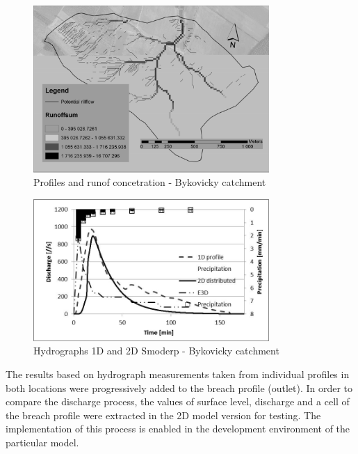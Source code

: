 \begin{figure}[ht!]
\centering
\includegraphics[width=0.8\textwidth]{img/byk.jpg}
\caption{Profiles and runof concetration - Bykovicky catchment }
\label{fig:horany2}
\end{figure}\FloatBarrier

\begin{figure}[ht!]
\renewcommand{\figurename}{Graf}
\centering
\includegraphics[width=0.8\textwidth]{graph/1D2DByk.jpg}
\caption{Hydrographs 1D and 2D Smoderp - Bykovicky catchment}
\label{graf:graf_2}
\end{figure}\FloatBarrier

The results based on hydrograph measurements taken from individual profiles in both locations were progressively added to the breach profile (outlet). In order to compare the discharge process, the values of surface level, discharge and a cell of the breach profile were extracted in the 2D model version for testing. The implementation of this process is enabled in the development environment of the particular model.
